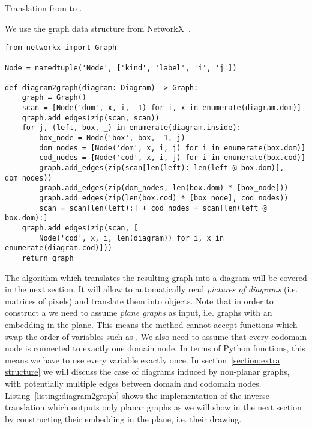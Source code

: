 \begin{python}\label{listing:diagram2graph}
{\normalfont Translation from  to .}

We use the graph data structure from NetworkX~\cite{HagbergEtAl08}.

\begin{verbatim}
from networkx import Graph

Node = namedtuple('Node', ['kind', 'label', 'i', 'j'])

def diagram2graph(diagram: Diagram) -> Graph:
    graph = Graph()
    scan = [Node('dom', x, i, -1) for i, x in enumerate(diagram.dom)]
    graph.add_edges(zip(scan, scan))
    for j, (left, box, _) in enumerate(diagram.inside):
        box_node = Node('box', box, -1, j)
        dom_nodes = [Node('dom', x, i, j) for i in enumerate(box.dom)]
        cod_nodes = [Node('cod', x, i, j) for i in enumerate(box.cod)]
        graph.add_edges(zip(scan[len(left): len(left @ box.dom)], dom_nodes))
        graph.add_edges(zip(dom_nodes, len(box.dom) * [box_node]))
        graph.add_edges(zip(len(box.cod) * [box_node], cod_nodes))
        scan = scan[len(left):] + cod_nodes + scan[len(left @ box.dom):]
    graph.add_edges(zip(scan, [
        Node('cod', x, i, len(diagram)) for i, x in enumerate(diagram.cod)]))
    return graph
\end{verbatim}
\end{python}

The  algorithm which translates the resulting graph into a diagram will be covered in the next section.
It will allow to automatically read \emph{pictures of diagrams} (i.e. matrices of pixels) and translate them into  objects.
Note that in order to construct a  we need to assume \emph{plane graphs} as input, i.e. graphs with an embedding in the plane.
This means the  method cannot accept functions which swap the order of variables such as .
We also need to assume that every codomain node is connected to exactly one domain node.
In terms of Python functions, this means we have to use every variable exactly once.
In section~\ref{section:extra structure} we will discuss the case of diagrams induced by non-planar graphs, with potentially multiple edges between domain and codomain nodes.
Listing~\ref{listing:diagram2graph} shows the implementation of the inverse translation  which outputs only planar graphs as we will show in the next section by constructing their embedding in the plane, i.e. their drawing.

